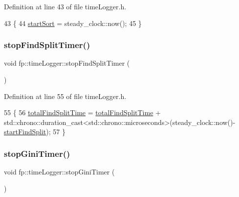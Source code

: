 Definition at line 43 of file time\+Logger.\+h.


\begin{DoxyCode}
43                                         \{
44                 \hyperlink{classfp_1_1timeLogger_afed53c702d6f414558eb7ca49f37ff22}{startSort} = steady\_clock::now();
45             \}
\end{DoxyCode}
\mbox{\label{classfp_1_1timeLogger_a99c7751d29c3a180fca00564089b9de7}} 
\subsubsection{\texorpdfstring{stop\+Find\+Split\+Timer()}{stopFindSplitTimer()}}
{\footnotesize\ttfamily void fp\+::time\+Logger\+::stop\+Find\+Split\+Timer (\begin{DoxyParamCaption}{ }\end{DoxyParamCaption})\hspace{0.3cm}{\ttfamily [inline]}}



Definition at line 55 of file time\+Logger.\+h.


\begin{DoxyCode}
55                                             \{
56                 \hyperlink{classfp_1_1timeLogger_a11998b4bff9e1f548f4468e25f79a6f2}{totalFindSplitTime} = \hyperlink{classfp_1_1timeLogger_a11998b4bff9e1f548f4468e25f79a6f2}{totalFindSplitTime} +
      std::chrono::duration\_cast<std::chrono::microseconds>(steady\_clock::now()-\hyperlink{classfp_1_1timeLogger_a1783656ae0d2e107cdfa87766ddc1a8c}{startFindSplit});
57             \}
\end{DoxyCode}
\mbox{\label{classfp_1_1timeLogger_ad5a58f08214d4d48b4740685506c130f}} 
\subsubsection{\texorpdfstring{stop\+Gini\+Timer()}{stopGiniTimer()}}
{\footnotesize\ttfamily void fp\+::time\+Logger\+::stop\+Gini\+Timer (\begin{DoxyParamCaption}{ }\end{DoxyParamCaption})\hspace{0.3cm}{\ttfamily [inline]}}



